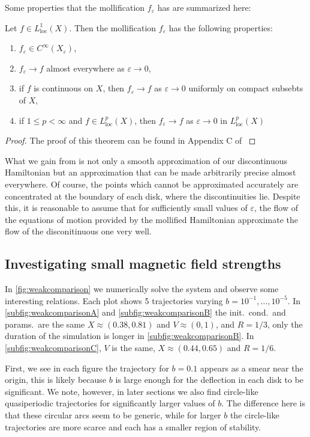 Some properties that the mollification $f_\varepsilon$ has are summarized here:
\begin{theorem}\label{thm:mollification}
Let $f\in L_{\text{loc}}^1(X)$. Then the mollification $f_\varepsilon$ has the following properties:
\begin{enumerate}
\item $f_\varepsilon\in C^\infty(X_\varepsilon)$,
\item $f_\varepsilon\to f$ almost everywhere as $\varepsilon\to0$,
\item if $f$ is continuous on $X$, then $f_\varepsilon\to f$ as $\varepsilon\to0$ uniformly on compact subsebts of $X$,
\item if $1\le p <\infty$ and $f\in L_{\text{loc}}^p(X)$, then $f_\varepsilon\to f$ as $\varepsilon\to 0$ in $L_{\text{loc}}^p(X)$
\end{enumerate}
\end{theorem}
\begin{proof}
The proof of this theorem can be found in Appendix C of \cite{Evans_1998}
\end{proof}

What we gain from  is not only a smooth approximation of our discontinuous Hamiltonian but an approximation that can be made arbitrarily precise almost everywhere. Of course, the points which cannot be approximated accurately are concentrated at the boundary of each disk, where the discontinuities lie. Despite this, it is reasonable to assume that for sufficiently small values of $\varepsilon$, the flow of the equations of motion provided by the mollified Hamiltonian approximate the flow of the disconitinuous one very well.


\subsection{Investigating small magnetic field strengths}

In \cref{fig:weakcomparison} we numerically solve the system and observe some interesting relations. Each plot shows 5 trajectories varying $b=10^{-1},\dots,10^{-5}$. In \cref{subfig:weakcomparisonA} and \cref{subfig:weakcomparisonB} the init.~cond.~and params.~are the same $X\approx(0.38,0.81)$ and $V\approx(0,1)$, and $R=1/3$, only the duration of the simulation is longer in \cref{subfig:weakcomparisonB}. In \cref{subfig:weakcomparisonC}, $V$ is the same, $X \approx(0.44,0.65)$ and $R=1/6$. 

First, we see in each figure the trajectory for $b=0.1$ appears as a smear near the origin, this is likely because $b$ is large enough for the deflection in each disk to be significant. We note, however, in later sections we also find circle-like quasiperiodic trajectories for significantly larger values of $b$. The difference here is that these circular arcs seem to be generic, while for larger $b$ the circle-like trajectories are more scarce and each has a smaller region of stability.

